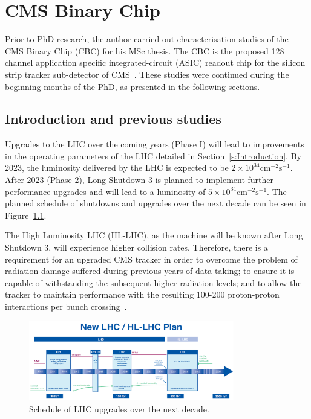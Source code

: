 \chapter{CMS Binary Chip}
\label{ac:cbc}

Prior to PhD research, the author carried out characterisation studies of the CMS Binary Chip (CBC) for his
MSc thesis. The CBC is the proposed 128 channel application specific integrated-circuit (ASIC) readout chip
for the silicon strip tracker sub-detector of CMS~\cite{JacobJA}. These studies were continued during the
beginning months of the PhD, as presented in the following sections.

\section{Introduction and previous studies}
\label{s:introduction_and_previous_studies}

Upgrades to the LHC over the coming years (Phase I) will lead to improvements in the operating parameters of
the LHC detailed in Section~\ref{s:Introduction}. By 2023, the luminosity delivered by the LHC is expected to
be $2\times10^{34}\mathrm{cm^{-2}s^{-1}}$. After 2023 (Phase 2), Long Shutdown 3 is planned to implement
further performance upgrades and will lead to a luminosity of $5\times10^{34}\mathrm{cm^{-2}s^{-1}}$.
The planned schedule of shutdowns and upgrades over the next decade can be seen
in Figure~\ref{fig:lhc_upgrades}.

The High Luminosity LHC (HL-LHC), as the machine will be known after Long Shutdown 3, will experience higher
collision rates. Therefore, there is a requirement for an upgraded CMS tracker in order to overcome the
problem of radiation damage suffered during previous years of data taking; to ensure it is capable of
withstanding the subsequent higher radiation levels; and to allow the tracker to maintain performance with
the resulting 100-200 proton-proton interactions per bunch crossing~\cite{Mersi:2011jv}.

\begin{figure}[ht] %
   \centering
     \includegraphics[width=0.8\textwidth]{Chapters/07_Appendices/07c_2_Images/newlhcplan}\hfill
     \caption{Schedule of LHC upgrades over the next decade.}
     \label{fig:lhc_upgrades}
\end{figure}

